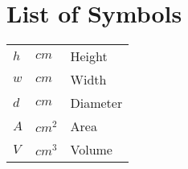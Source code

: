 \clearpage
\chapter*{List of Symbols}


\begin{tabular}{lll}
    $h$     & $cm$      & Height\\
    $w$     & $cm$      & Width\\
    $d$     & $cm$      & Diameter\\
    $A$     & $cm^2$    & Area\\
    $V$     & $cm^3$    & Volume
\end{tabular}
